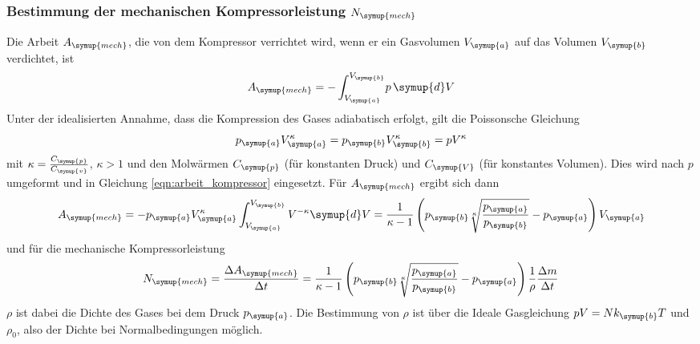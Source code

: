   \subsubsection{Bestimmung der mechanischen Kompressorleistung $N_\symup{mech}$}
  Die Arbeit $A_\symup{mech}$, die von dem Kompressor verrichtet wird, wenn er ein
  Gasvolumen $V_\symup{a}$ auf das Volumen $V_\symup{b}$ verdichtet, ist
  \begin{equation}
    A_\symup{mech} = - \int_{V_\symup{a}}^{V_\symup{b}} \!p \,\symup{d}V
    \label{eqn:arbeit_kompressor}
  \end{equation}
  Unter der idealisierten Annahme, dass die Kompression des Gases adiabatisch erfolgt,
  gilt die Poissonsche Gleichung
  \begin{equation}
    p_\symup{a} V_\symup{a}^\kappa = p_\symup{b} V_\symup{b}^\kappa = p V^\kappa
    \label{eqn:poissongl}
  \end{equation}
  mit $\kappa = \frac{C_\symup{p}}{C_\symup{v}}$, $\kappa > 1$ und den Molwärmen
  $C_\symup{p}$ (für konstanten Druck) und $C_\symup{V}$ (für konstantes Volumen).
  Dies wird nach $p$ umgeformt und in Gleichung \eqref{eqn:arbeit_kompressor}
  eingesetzt. Für $A_\symup{mech}$ ergibt sich dann
  \begin{equation}
    A_\symup{mech} = - p_\symup{a} V_\symup{a}^\kappa
    \int_{V_\symup{a}}^{V_\symup{b}} V^{-\kappa} \symup{d}V
    = \frac{1}{\kappa - 1}\left(p_\symup{b} \sqrt[\kappa]{\frac{p_\symup{a}}{p_\symup{b}}}
    - p_\symup{a} \right) V_\symup{a}
    \label{eqn:arbeit2}
  \end{equation}
  und für die mechanische Kompressorleistung
 \begin{equation}
   N_\symup{mech} = \frac{\Delta A_\symup{mech}}{\Delta t}
   = \frac {1}{\kappa - 1}\left(p_\symup{b} \sqrt[\kappa]{\frac{p_\symup{a}}{p_\symup{b}}}
   - p_\symup{a} \right) \frac{1}{\rho} \frac{\Delta m}{\Delta t}
   \label{eqn:kompressorleistung}
 \end{equation}
 $\rho$ ist dabei die Dichte des Gases bei dem Druck $p_\symup{a}$. Die Bestimmung
 von $\rho$ ist über die Ideale Gasgleichung $pV=Nk_\symup{b}T$ und $\rho_0$, also
 der Dichte bei Normalbedingungen möglich.
\cite{sample}
